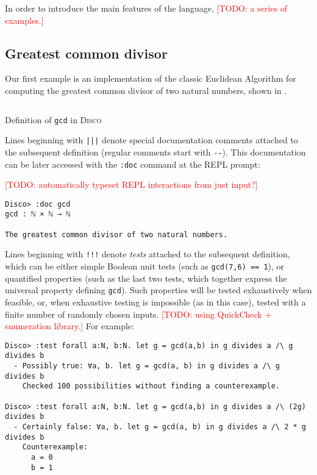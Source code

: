 \documentclass[submission,copyright,creativecommons]{eptcs}
\newcommand{\disco}{\textsc{Disco}\xspace}
\newcommand{\pref}[1]{\prettyref{#1}}
\newcommand{\todo}[1]{\textcolor{red}{[TODO: #1]}}
\newcommand{\todo}[1]{}
\begin{document}
In order to introduce the main features of the language, \todo{a series
of examples.}

\subsection{Greatest common divisor}
\label{sec:gcd}

Our first example is an implementation of the classic Euclidean
Algorithm for computing the greatest common divisor of two natural
numbers, shown in \pref{lst:gcd}.

\begin{listing}[!htp]
\inputminted{text}{examples/gcd.disco}
\caption{Definition of \texttt{gcd} in \disco}
\label{lst:gcd}
\end{listing}

Lines beginning with \texttt{|||} denote special documentation
comments attached to the subsequent definition (regular comments start with
\texttt{-{}-}).  This documentation can be later accessed with the
\texttt{:doc} command at the REPL prompt:

\todo{automatically typeset REPL interactions from just input?}
\begin{verbatim}
Disco> :doc gcd
gcd : ℕ × ℕ → ℕ

The greatest common divisor of two natural numbers.

\end{verbatim}

Lines beginning with \texttt{!!!} denote \emph{tests} attached to the
subsequent definition, which can be either simple Boolean unit tests
(such as \verb|gcd(7,6) == 1|), or quantified properties (such as the
last two tests, which together express the universal property defining
\verb|gcd|).  Such properties will be tested exhaustively when
feasible, or, when exhaustive testing is impossible (as in this case),
tested with a finite number of randomly chosen inputs. \todo{using
QuickCheck + enumeration library.}  For example:

\begin{verbatim}
Disco> :test forall a:N, b:N. let g = gcd(a,b) in g divides a /\ g divides b
  - Possibly true: ∀a, b. let g = gcd(a, b) in g divides a /\ g divides b
    Checked 100 possibilities without finding a counterexample.

Disco> :test forall a:N, b:N. let g = gcd(a,b) in g divides a /\ (2g) divides b
  - Certainly false: ∀a, b. let g = gcd(a, b) in g divides a /\ 2 * g divides b
    Counterexample:
      a = 0
      b = 1

\end{verbatim}
\end{document}
